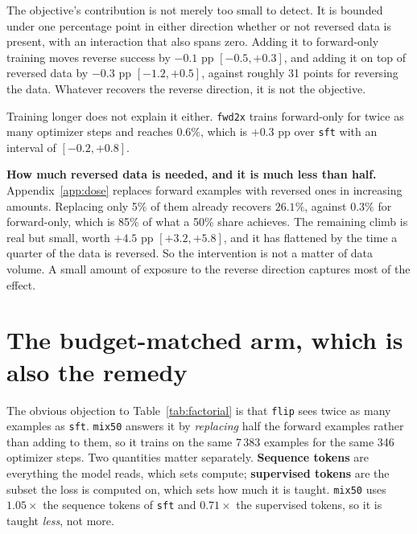 \documentclass{article}
\newcommand{\arm}[1]{\texttt{#1}}
\begin{document}
The objective's contribution is not merely too small to detect. It is bounded under one
percentage point in either direction whether or not reversed data is present, with an
interaction that also spans zero. Adding it to forward-only training moves reverse success by
$-0.1$ pp $[-0.5,+0.3]$, and adding it on top of reversed data by $-0.3$ pp $[-1.2,+0.5]$,
against roughly 31 points for reversing the data. Whatever recovers the reverse direction, it
is not the objective.

Training longer does not explain it either. \arm{fwd2x} trains forward-only for twice as
many optimizer steps and reaches $0.6\%$, which is $+0.3$ pp over \arm{sft} with an
interval of $[-0.2,+0.8]$.

\textbf{How much reversed data is needed, and it is much less than half.}
Appendix~\ref{app:dose} replaces forward examples with reversed ones in increasing amounts.
Replacing only 5\% of them already recovers $26.1\%$, against $0.3\%$ for forward-only,
which is 85\% of what a 50\% share achieves. The remaining climb is real but small, worth
$+4.5$ pp $[+3.2,+5.8]$, and it has flattened by the time a quarter of the data is
reversed. So the intervention is not a matter of data volume. A small amount of exposure to
the reverse direction captures most of the effect.


\section{The budget-matched arm, which is also the remedy}
\label{sec:budget}

The obvious objection to Table~\ref{tab:factorial} is that \arm{flip} sees twice as many
examples as \arm{sft}. \arm{mix50} answers it by \emph{replacing} half the forward examples
rather than adding to them, so it trains on the same 7\,383 examples for the same 346
optimizer steps. Two quantities matter separately. \textbf{Sequence tokens} are everything the
model reads, which sets compute; \textbf{supervised tokens} are the subset the loss is computed
on, which sets how much it is taught. \arm{mix50} uses $1.05\times$ the sequence tokens of
\arm{sft} and $0.71\times$ the supervised tokens, so it is taught \emph{less}, not more.
\end{document}
